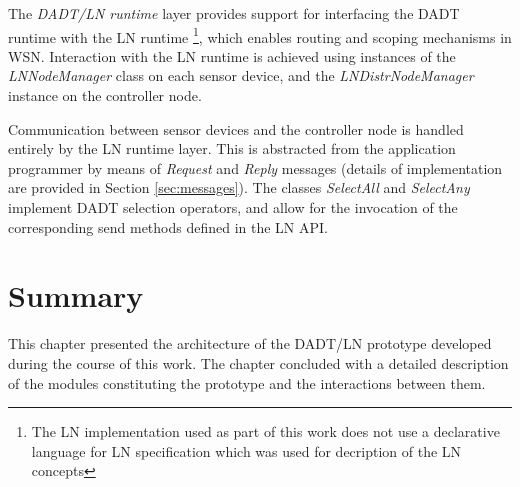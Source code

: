 The \emph{DADT/LN runtime} layer provides support for interfacing the DADT
runtime with the LN runtime \footnote{The LN implementation
used as part of this work does not use a declarative language for LN
specification which was used for decription of the LN concepts}, which enables
routing and scoping mechanisms in WSN. 
Interaction with the LN runtime is achieved using instances of
the \emph{LNNodeManager} class on each sensor device, and the \emph{LNDistrNodeManager} instance on the controller node.

Communication between sensor devices and the controller node is handled entirely
by
the LN runtime layer. This is abstracted from the application programmer by means of
\emph{Request} and \emph{Reply} messages (details of implementation are provided
in Section \ref{sec:messages}). The classes \emph{SelectAll} and \emph{SelectAny} implement
DADT selection operators, and allow for the invocation of the corresponding send methods defined in the LN API.

\section{Summary}

This chapter presented the architecture of the DADT/LN
prototype developed during the course of this work. The chapter concluded with a
detailed description of the modules constituting the prototype and 
the interactions between them.
